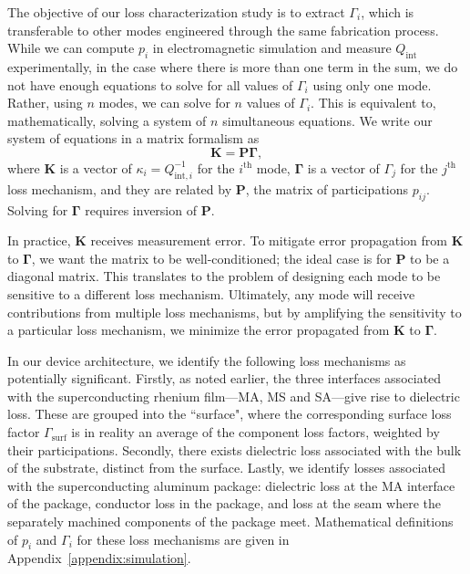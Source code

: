 \documentclass[
    reprint,
    superscriptaddress,
    amsmath,amssymb,
    aps,
    prb,
    floatfix,
]{revtex4-2}
\begin{document}
The objective of our loss characterization study is to extract $\Gamma_i$, which is transferable to other modes engineered through the same fabrication process. While we can compute $p_i$ in electromagnetic simulation and measure $Q_\mathrm{int}$ experimentally, in the case where there is more than one term in the sum, we do not have enough equations to solve for all values of $\Gamma_i$ using only one mode. Rather, using $n$ modes, we can solve for $n$ values of $\Gamma_i$. This is equivalent to, mathematically, solving a system of $n$ simultaneous equations. We write our system of equations in a matrix formalism as
\begin{equation}
    \mathbf{K} = \mathbf{P}\mathbf{\Gamma},
    \label{eq:matrix}
\end{equation}
where $\mathbf{K}$ is a vector of $\kappa_i=Q_{\mathrm{int},i}^{-1}$ for the $i^\mathrm{th}$ mode, $\mathbf{\Gamma}$ is a vector of $\Gamma_j$ for the $j^\mathrm{th}$ loss mechanism, and they are related by $\mathbf{P}$, the matrix of participations $p_{ij}$. Solving for $\mathbf{\Gamma}$ requires inversion of $\mathbf{P}$.

In practice, $\mathbf{K}$ receives measurement error. To mitigate error propagation from $\mathbf{K}$ to $\mathbf{\Gamma}$, we want the matrix to be well-conditioned; the ideal case is for $\mathbf{P}$ to be a diagonal matrix. This translates to the problem of designing each mode to be sensitive to a different loss mechanism. Ultimately, any mode will receive contributions from multiple loss mechanisms, but by amplifying the sensitivity to a particular loss mechanism, we minimize the error propagated from $\mathbf{K}$ to $\mathbf{\Gamma}$.

In our device architecture, we identify the following loss mechanisms as potentially significant. Firstly, as noted earlier, the three interfaces associated with the superconducting rhenium film---MA, MS and SA---give rise to dielectric loss. These are grouped into the ``surface", where the corresponding surface loss factor $\Gamma_\mathrm{surf}$ is in reality an average of the component loss factors, weighted by their participations. Secondly, there exists dielectric loss associated with the bulk of the substrate, distinct from the surface. Lastly, we identify losses associated with the superconducting aluminum package: dielectric loss at the MA interface of the package, conductor loss in the package, and loss at the seam where the separately machined components of the package meet. Mathematical definitions of $p_i$ and $\Gamma_i$ for these loss mechanisms are given in Appendix~\ref{appendix:simulation}.
\end{document}
